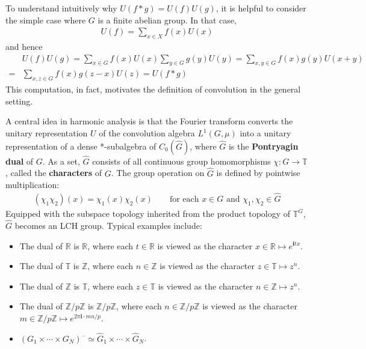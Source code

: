 \documentclass[12pt,b5paper,notitlepage]{article}
\theoremstyle{definition}
\theoremstyle{plain}
\newcommand{\wht}{\widehat}
\newcommand{\im}{\mathbf{i}}
\newcommand{\Zbb}{\mathbb Z}
\newcommand{\Rbb}{\mathbb R}
\newcommand{\Tbb}{\mathbb T}
\numberwithin{equation}{section}
\begin{document}
To understand intuitively why $U(f*g)=U(f)U(g)$, it is helpful to consider the simple case where $G$ is a finite abelian group. In that case,
\begin{align*}
U(f)=\sum_{x\in X}f(x)U(x)
\end{align*}
and hence
\begin{align*}
&U(f)U(g)=\sum_{x\in G}f(x)U(x)\sum_{y\in G}g(y)U(y)=\sum_{x,y\in G}f(x)g(y)U(x+y)\\
=&\sum_{x,z\in G}f(x)g(z-x)U(z)=U(f*g)
\end{align*}
This computation, in fact, motivates the definition of convolution in the general setting.


A central idea in harmonic analysis is that the Fourier transform converts the unitary representation $U$ of the convolution algebra $L^1(G,\mu)$ into a unitary representation of a dense *-subalgebra of $C_0(\wht G)$, where $\wht G$ is the \textbf{Pontryagin dual}  of $G$. As a set, $\wht G$ consists of all continuous group homomorphisms $\chi:G\rightarrow\Tbb$, called the \textbf{characters}  of $G$. The group operation on $\wht G$ is defined by pointwise multiplication:
\begin{align*}
(\chi_1\chi_2)(x)=\chi_1(x)\chi_2(x)\qquad\text{for each $x\in G$ and $\chi_1,\chi_2\in\wht G$}
\end{align*}
Equipped with the subspace topology inherited from the product topology of $\Tbb^G$, $\wht G$ becomes an LCH group. Typical examples include:
\begin{itemize}
\item The dual of $\Rbb$ is $\Rbb$, where each $t\in\Rbb$ is viewed as the character $x\in\Rbb\mapsto e^{\im tx}$.
\item The dual of $\Tbb$ is $\Zbb$, where each $n\in\Zbb$ is viewed as the character $z\in\Tbb\mapsto z^n$.
\item The dual of $\Zbb$ is $\Tbb$, where each $z\in\Tbb$ is viewed as the character $n\in\Zbb\mapsto z^n$.
\item The dual of $\Zbb/p\Zbb$ is $\Zbb/p\Zbb$, where each $n\in\Zbb/p\Zbb$ is viewed as the character $m\in\Zbb/p\Zbb\mapsto e^{2\pi\im\cdot mn/p}$.
\item $(G_1\times\cdots\times G_N)^{\wht{~~\,}}\simeq \wht G_1\times\cdots\times\wht G_N$.
\end{itemize}
\end{document}
